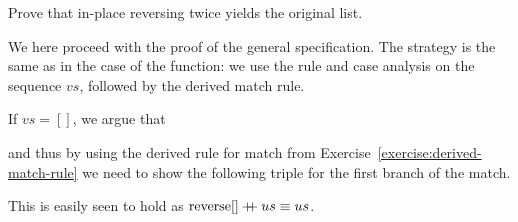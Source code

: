 \begin{example}
  
  \begin{exercise}
    Prove that in-place reversing twice yields the original list.
  \end{exercise}
  

  We here proceed with the proof of the general specification. The
  strategy is the same as in the case of the  function: we
  use the  rule and case analysis on the sequence $vs$,
  followed by the derived match rule.

  If $vs=[]$, we argue that
  \begin{mathpar}
  \end{mathpar}
  and thus by using the derived rule for match from Exercise~\ref{exercise:derived-match-rule} we need to show the following triple for the first branch of the match.
  \begin{mathpar}
  \end{mathpar}
  This is easily seen to hold as $\operatorname{reverse} [] \mdoubleplus us \equiv us$.


\end{example}
